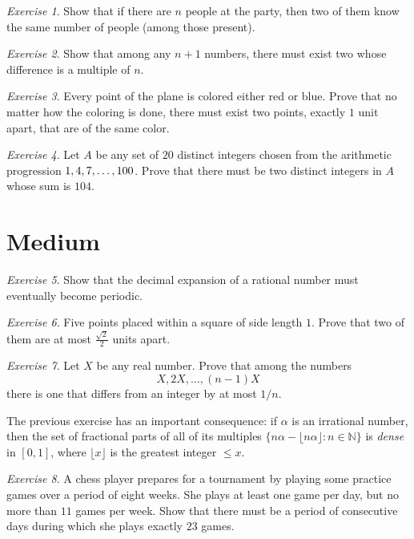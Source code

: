 \documentclass{article}
\theoremstyle{definition}
\theoremstyle{remark}
\newtheorem{exercise}{Exercise}
\newcommand{\NN}{\mathbb{N}}
\begin{document}
\begin{exercise}
 Show that if there are $n$ people at the party, then two of them know the same number of people (among those present).
\end{exercise}

\begin{exercise}
Show that among any $n+1$ numbers, there must exist two whose difference is a multiple of $n$.
\end{exercise}

\begin{exercise}
Every point of the plane is colored either red or blue. Prove that no matter how the coloring is done, there must exist two points, exactly $1$ unit apart, that are of the same color.
\end{exercise}

\begin{exercise}
Let $A$ be any set of $20$ distinct integers chosen from the arithmetic progression $1,4,7,\dots,\\ 100$. Prove that there must be two distinct integers in $A$ whose sum is $104$.
\end{exercise}

\section{Medium}

\begin{exercise}
Show that the decimal expansion of a rational number must eventually become periodic.
\end{exercise}

\begin{exercise}
 Five points placed within a square of side length $1$. Prove that two of them are at most $\frac{\sqrt{2}}{2}$  units apart.
\end{exercise}

\begin{exercise}
 Let $X$ be any real number. Prove that among the numbers \[X,2X,\dots,(n-1)X\] there is one that differs from an integer by at most $1/n$. 
\end{exercise}
The previous exercise has an important consequence: if $\alpha$ is an irrational number, then the set of fractional parts of all of its multiples \(\{n\alpha-\lfloor n\alpha \rfloor : n\in \NN\}\) is \emph{dense} in $[0,1]$, where $\lfloor x\rfloor $ is the greatest integer $\leq x$.

\begin{exercise}
A chess player prepares for a tournament by playing some practice games over a period of eight weeks. She plays at least one game per day, but no more than $11$ games per week. Show that there must be a period of consecutive days during which she plays exactly $23$ games.
\end{exercise}
\end{document}
